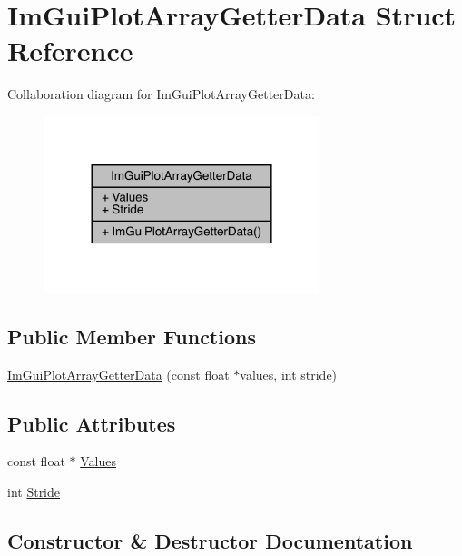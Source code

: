 \hypertarget{struct_im_gui_plot_array_getter_data}{}\section{Im\+Gui\+Plot\+Array\+Getter\+Data Struct Reference}
\label{struct_im_gui_plot_array_getter_data}


Collaboration diagram for Im\+Gui\+Plot\+Array\+Getter\+Data\+:
\nopagebreak
\begin{figure}[H]
\begin{center}
\leavevmode
\includegraphics[width=228pt]{da/d43/struct_im_gui_plot_array_getter_data__coll__graph}
\end{center}
\end{figure}
\subsection*{Public Member Functions}
\begin{DoxyCompactItemize}
\item 
\mbox{\hyperlink{struct_im_gui_plot_array_getter_data_a9c4037621f1c247957c04dc8ae1f2903}{Im\+Gui\+Plot\+Array\+Getter\+Data}} (const float $\ast$values, int stride)
\end{DoxyCompactItemize}
\subsection*{Public Attributes}
\begin{DoxyCompactItemize}
\item 
const float $\ast$ \mbox{\hyperlink{struct_im_gui_plot_array_getter_data_aa40ff2e945549744fc622891089ae0fd}{Values}}
\item 
int \mbox{\hyperlink{struct_im_gui_plot_array_getter_data_aecb2cce4ea91d95ec81937de656cfcd6}{Stride}}
\end{DoxyCompactItemize}


\subsection{Constructor \& Destructor Documentation}
\mbox{\label{struct_im_gui_plot_array_getter_data_a9c4037621f1c247957c04dc8ae1f2903}} 
